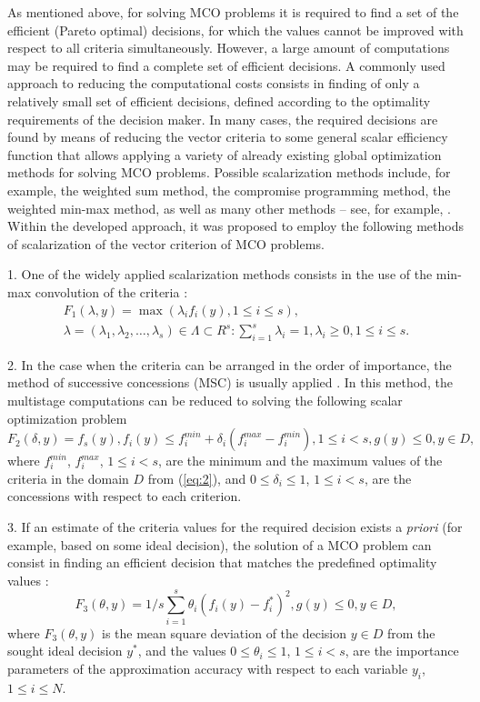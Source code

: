\documentclass[runningheads]{llncs}
\begin{document}
As mentioned above, for solving MCO problems it is required to find a set of the efficient (Pareto optimal) decisions, for which the values cannot be improved with respect to all criteria simultaneously. However, a large amount of computations may be required to  find a complete set of efficient decisions. A commonly used approach to reducing the computational costs consists in finding of only a relatively small set of efficient decisions, defined according to the optimality requirements of the decision maker. In many cases, the required decisions are found by means of reducing the vector criteria to some general scalar efficiency function that allows applying a variety of already existing global optimization methods for solving MCO problems. Possible scalarization methods include, for example, the weighted sum method, the compromise programming method, the weighted min-max method, as well as many other methods -- see, for example, \cite{c2,c4}. Within the developed approach, it was proposed to employ the following methods of scalarization of the vector criterion of MCO problems.

1. One of the widely applied scalarization methods consists in the use of the min-max convolution of the criteria \cite{c4,c6}:
\begin{equation}
\begin{split}
F_1 (\lambda,y)=\max{(\lambda_i f_i (y),1 \leq i \leq s)}, \\
\lambda=(\lambda_1,\lambda_2,\dots,\lambda_s)\in \Lambda \subset R^s: \sum_{i=1}^s{\lambda_i=1}, \lambda_i \geq 0, 1 \leq i \leq s.
\end{split}
\label{eq:4}
\end{equation}

2. In the case when the criteria can be arranged in the order of importance, the method of successive concessions (MSC) is usually applied \cite{c5,c6}. In this method, the multistage computations can be reduced to solving the following scalar optimization problem 
\begin{equation}
F_2(\delta,y)=f_s(y), f_i(y) \leq f_i^{min}+\delta_i (f_i^{max}- f_i^{min}), 1 \leq i < s, g(y) \leq 0,y \in D,
\label{eq:5}
\end{equation}
where $f_i^{min}$, $f_i^{max}$, $1 \leq i < s$, are the minimum and the maximum values of the criteria in the domain $D$ from (\ref{eq:2}), and $0 \leq \delta_i \leq 1$, $1 \leq i < s$, are the concessions with respect to each criterion. 

3. If an estimate of the criteria values for the required decision exists a \textit{priori} (for example, based on some ideal decision), the solution of a MCO problem can consist in finding an efficient decision that matches the predefined optimality values \cite{c2,c4}:
\begin{equation}
F_3 (\theta,y)= 1/s \sum_{i=1}^s{\theta_i(f_i(y)-f_i^*)^2 }, g(y) \leq 0, y \in D,
\label{eq:6}
\end{equation}
where $F_3 (\theta,y)$ is the mean square deviation of the decision $y \in D$ from the sought ideal decision $y^*$, and the values $0\leq \theta_i \leq 1$, $1 \leq i < s$, are the importance parameters of the approximation accuracy with respect to each variable $y_i$, $1 \leq i \leq N$.
\end{document}
